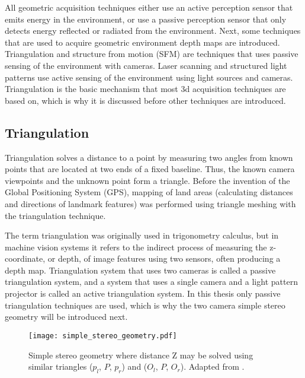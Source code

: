 \documentclass[12pt,a4paper,oneside,pdftex]{report}
\begin{document}
{All geometric acquisition techniques either use an active perception sensor that emits energy in the environment, or use a passive perception sensor that only detects energy reflected or radiated from the environment. Next, some techniques that are used to acquire geometric environment depth maps are introduced. Triangulation and structure from motion (SFM) are techniques that uses passive sensing of the environment with cameras. Laser scanning and structured light patterns use active sensing of the environment using light sources and cameras. Triangulation is the basic mechanism that most 3d acquisition techniques are based on, which is why it is discussed before other techniques are introduced.

\subsection{Triangulation}
\label{subsection:triangulation}

Triangulation solves a distance to a point by measuring two angles from known points that are located at two ends of a fixed baseline. Thus, the known camera viewpoints and the unknown point form a triangle. Before the invention of the Global Positioning System (GPS), mapping of land areas (calculating distances and directions of landmark features) was performed using triangle meshing with the triangulation technique.

The term triangulation was originally used in trigonometry calculus, but in machine vision systems it refers to the indirect process of measuring the z-coordinate, or depth, of image features using two sensors, often producing a depth map. Triangulation system that uses two cameras is called a passive triangulation system, and a system that uses a single camera and a light pattern projector is called an active triangulation system. In this thesis only passive triangulation techniques are used, which is why the two camera simple stereo geometry will be introduced next.

\begin{figure}[ht]
  \begin{center}
    \texttt{[image: simple\_stereo\_geometry.pdf]}
    \caption{Simple stereo geometry where distance Z may be solved using similar triangles ($p_l$, $P$, $p_r$) and ($O_l$, $P$, $O_r$). Adapted from \citep{Trucco98}.}
    \label{fig:simple_stereo_geometry}
  \end{center}
\end{figure}

}
\end{document}

